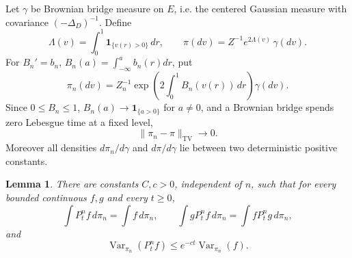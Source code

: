 \documentclass[12pt]{article}
\newtheorem{lemma}{Lemma}
\newcommand{\1}{\mathbf 1}
\newcommand{\Var}{\operatorname{Var}}
\newcommand{\TV}{\operatorname{TV}}
\begin{document}
Let \(\gamma\) be Brownian bridge measure on \(E\), i.e. the centered Gaussian
measure with covariance \((-\Delta_D)^{-1}\).  Define
\[
  \Lambda(v)=\int_0^1\1_{\{v(r)>0\}}\,dr,\qquad
  \pi(dv)=Z^{-1}e^{2\Lambda(v)}\,\gamma(dv).                 \tag{13}
\]
For \(B_n'=b_n\), \(B_n(a)=\int_{-\infty}^ab_n(r)dr\), put
\[
   \pi_n(dv)=Z_n^{-1}\exp\left(2\int_0^1B_n(v(r))\,dr\right)\gamma(dv).
\]
Since \(0\le B_n\le1\), \(B_n(a)\to\1_{\{a>0\}}\) for \(a\ne0\), and a
Brownian bridge spends zero Lebesgue time at a fixed level,
\[
        \|\pi_n-\pi\|_{\TV}\to0 .                            \tag{14}
\]
Moreover all densities \(d\pi_n/d\gamma\) and \(d\pi/d\gamma\) lie between
two deterministic positive constants.

\begin{lemma}\label{lem:reggap}
There are constants \(C,c>0\), independent of \(n\), such that for every
bounded continuous \(f,g\) and every \(t\ge0\),
\[
 \int P_t^n f\,d\pi_n=\int f\,d\pi_n,\qquad
 \int gP_t^n f\,d\pi_n=\int fP_t^n g\,d\pi_n,                \tag{15}
\]
and
\[
        \Var_{\pi_n}(P_t^n f)\le e^{-ct}\Var_{\pi_n}(f).      \tag{16}
\]
\end{lemma}
\end{document}
